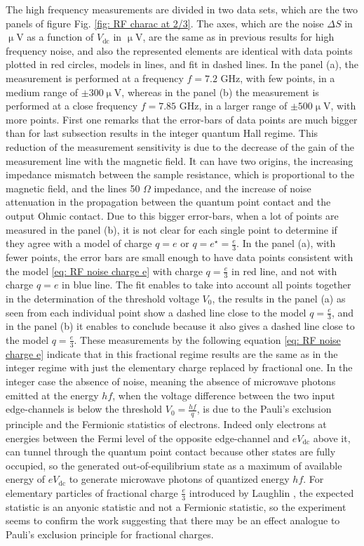The high frequency measurements are divided in two data sets, which are the two panels of figure Fig. \ref{fig: RF charac at 2/3}.
The axes, which are the noise $\Delta S$ in $\upmu$V as a function of $V_{\mathrm{dc}}$ in $\upmu$V, are the same as in previous results for high frequency noise, and also the represented elements are identical with data points plotted in red circles, models in lines, and fit in dashed lines.
In the panel (a), the measurement is performed at a frequency $f = 7.2$ GHz, with few points, in a medium range of $\pm300 \upmu$V, whereas in the panel (b) the measurement is performed at a close frequency $f = 7.85$ GHz, in a larger range of $\pm500 \upmu$V, with more points.
First one remarks that the error-bars of data points are much bigger than for last subsection results in the integer quantum Hall regime.
This reduction of the measurement sensitivity is due to the decrease of the gain of the measurement line with the magnetic field.
It can have two origins, the increasing impedance mismatch between the sample resistance, which is proportional to the magnetic field, and the lines 50 $\Omega$ impedance, and the increase of noise attenuation in the propagation between the quantum point contact and the output Ohmic contact.
Due to this bigger error-bars, when a lot of points are measured in the panel (b), it is not clear for each single point to determine if they agree with a model of charge $q = e$ or $q = e^{\star} = \frac{e}{3}$.
In the panel (a), with fewer points, the error bars are small enough to have data points consistent with the model \ref{eq: RF noise charge e} with charge $q = \frac{e}{3}$ in red line, and not with charge $q = e$ in blue line.
The fit enables to take into account all points together in the determination of the threshold voltage $V_{0}$, the results in the panel (a) as seen from each individual point show a dashed line close to the model $q = \frac{e}{3}$, and in the panel (b) it enables to conclude because it also gives a dashed line close to the model $q = \frac{e}{3}$.
These measurements by the following equation \ref{eq: RF noise charge e} indicate that in this fractional regime results are the same as in the integer regime with just the elementary charge replaced by fractional one.
In the integer case the absence of noise, meaning the absence of microwave photons emitted at the energy $hf$, when the voltage difference between the two input edge-channels is below the threshold $V_{0} = \frac{hf}{q}$, is due to the Pauli's exclusion principle and the Fermionic statistics of electrons.
Indeed only electrons at energies between the Fermi level of the opposite edge-channel and $eV_{\mathrm{dc}}$ above it, can tunnel through the quantum point contact because other states are fully occupied, so the generated out-of-equilibrium state as a maximum of available energy of $eV_{\mathrm{dc}}$ to generate microwave photons of quantized energy $hf$.
For elementary particles of fractional charge $\frac{e}{3}$ introduced by Laughlin \cite{laughlin1983anomalous}, the expected statistic is an anyonic statistic and not a Fermionic statistic, so the experiment seems to confirm the work \cite{haldane1991fractional} suggesting that there may be an effect analogue to Pauli's exclusion principle for fractional charges.

